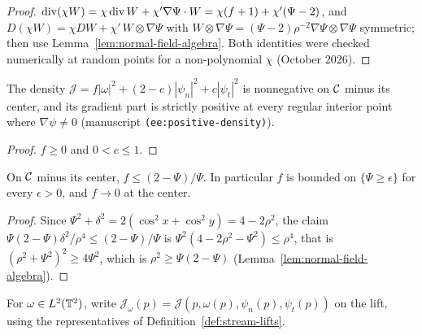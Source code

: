 \begin{proof}
\leanok
$\operatorname{div}(\chi W)=\chi\operatorname{div} W+\chi'\nabla\Psi\cdot W=\chi(f+1)+\chi'(\Psi-2)$, and
$D(\chi W)=\chi DW+\chi'\,W\otimes\nabla\Psi$ with $W\otimes\nabla\Psi=(\Psi-2)\rho^{-2}\nabla\Psi\otimes\nabla\Psi$
symmetric; then use Lemma~\ref{lem:normal-field-algebra}. Both identities were checked
numerically at random points for a non-polynomial $\chi$ (October 2026).
\end{proof}

\begin{lemma}
\label{lem:ee-density}
\leanok
The density $\mathcal J=f|\omega|^2+(2-c)|\psi_n|^2+c|\psi_t|^2$ is
nonnegative on $\mathcal{C}$ minus its center, and its gradient part is strictly positive at every
regular interior point where $\nabla\psi\ne0$ (manuscript
\texttt{(ee:positive-density)}).
\end{lemma}

\begin{proof}
\leanok
$f\ge0$ and $0<c\le1$.
\end{proof}

\begin{lemma}
\label{lem:normal-coeff-bound}
\leanok
On $\mathcal{C}$ minus its center, $f\le(2-\Psi)/\Psi$. In particular $f$ is bounded on
$\{\Psi\ge\epsilon\}$ for every $\epsilon>0$, and $f\to0$ at the center.
\end{lemma}

\begin{proof}
\leanok
Since $\Psi^2+\delta^2=2(\cos^2x+\cos^2y)=4-2\rho^2$, the claim
$\Psi(2-\Psi)\delta^2/\rho^4\le(2-\Psi)/\Psi$ is $\Psi^2(4-2\rho^2-\Psi^2)\le\rho^4$, that is
$(\rho^2+\Psi^2)^2\ge4\Psi^2$, which is $\rho^2\ge\Psi(2-\Psi)$
(Lemma~\ref{lem:normal-field-algebra}).
\end{proof}

\begin{definition}
\label{def:ee-bulk-density}
\leanok
For $\omega\in L^2(\mathbb{T}^2)$, write
$\mathcal J_\omega(p)=\mathcal J(p,\omega(p),\psi_n(p),\psi_t(p))$
on the lift, using the representatives of Definition~\ref{def:stream-lifts}.
\end{definition}

